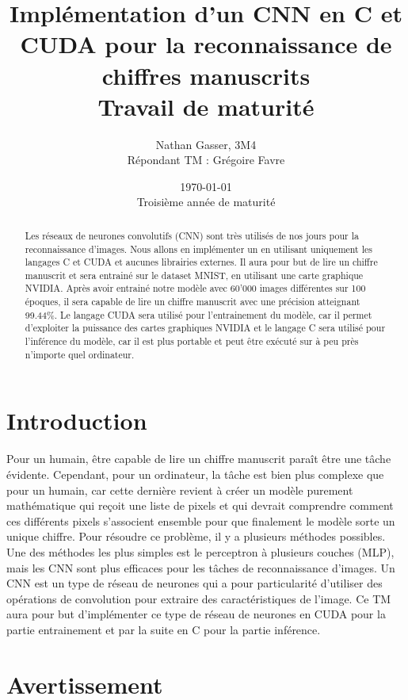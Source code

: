 \documentclass{article}
\title{
Implémentation d'un CNN en C et CUDA pour la reconnaissance de chiffres manuscrits \\ 
\large{Travail de maturité}
}
\author{
Nathan Gasser, 3M4 \\
Répondant TM : Grégoire Favre
}
\date{
\today \\
Troisième année de maturité
}
\begin{document}
\maketitle

\newpage

\begin{abstract}
Les réseaux de neurones convolutifs (CNN) sont très utilisés de nos jours pour la reconnaissance d'images. Nous allons en implémenter un en utilisant uniquement les langages C et CUDA et aucunes librairies externes. Il aura pour but de lire un chiffre manuscrit et sera entrainé sur le dataset MNIST, en utilisant une carte graphique NVIDIA. Après avoir entrainé notre modèle avec 60'000 images différentes sur 100 époques, il sera capable de lire un chiffre manuscrit avec une précision atteignant 99.44\%. Le langage CUDA sera utilisé pour l'entrainement du modèle, car il permet d'exploiter la puissance des cartes graphiques NVIDIA et le langage C sera utilisé pour l'inférence du modèle, car il est plus portable et peut être exécuté sur à peu près n'importe quel ordinateur.

\end{abstract}

\newpage

\tableofcontents

\newpage

\section{Introduction}
Pour un humain, être capable de lire un chiffre manuscrit paraît être une tâche évidente. Cependant, pour un ordinateur, la tâche est bien plus complexe que pour un humain, car cette dernière revient à créer un modèle purement mathématique qui reçoit une liste de pixels et qui devrait comprendre comment ces différents pixels s'associent ensemble pour que finalement le modèle sorte un unique chiffre. Pour résoudre ce problème, il y a plusieurs méthodes possibles. Une des méthodes les plus simples est le perceptron à plusieurs couches (MLP), mais les CNN sont plus efficaces pour les tâches de reconnaissance d'images. Un CNN est un type de réseau de neurones qui a pour particularité d'utiliser des opérations de convolution pour extraire des caractéristiques de l'image. Ce TM aura pour but d'implémenter ce type de réseau de neurones en CUDA pour la partie entrainement et par la suite en C pour la partie inférence.

\section{Avertissement}
\end{document}
